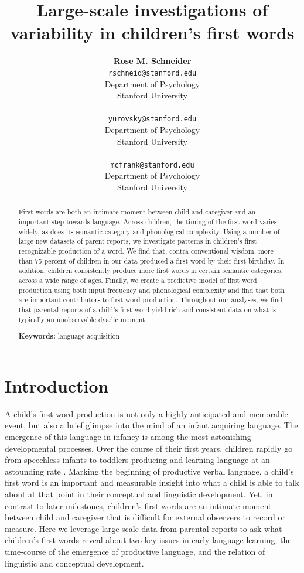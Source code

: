 \documentclass[10pt,letterpaper]{article}
\title{Large-scale investigations of variability in children's first words}
\author{{\large \bf Rose M. Schneider} \\ \texttt{rschneid@stanford.edu}\\ Department of Psychology \\ Stanford University \\ 
\And {\large \bf Daniel Yurovsky} \\ \texttt{yurovsky@stanford.edu} \\ Department of Psychology \\ Stanford University \\ 
\And {\large \bf Michael C. Frank} \\ \texttt{mcfrank@stanford.edu} \\ Department of Psychology \\ Stanford University \\ }
\begin{document}
\maketitle


\begin{abstract}
First words are both an intimate moment between child and caregiver and an important step towards language. Across children, the timing of the first word varies widely, as does its semantic category and phonological complexity. Using a number of large new datasets of parent reports, we investigate patterns in children's first recognizable production of a word. We find that, contra conventional wisdom, more than 75 percent of children in our data produced a first word by their first birthday. In addition, children consistently produce more first words in certain semantic categories, across a wide range of ages. Finally, we create a predictive model of first word production using both input frequency and phonological complexity and find that both are important contributors to first word production. Throughout our analyses, we find that parental reports of a child's first word yield rich and consistent data on what is typically an unobservable dyadic moment. 


\textbf{Keywords:}
language acquisition
\end{abstract}

\section{Introduction}

A child's first word production is not only a highly anticipated and memorable event, but also a brief glimpse into the mind of an infant acquiring language. The emergence of this language in infancy is among the most astonishing developmental processes. Over the course of their first years, children rapidly go from speechless infants to toddlers producing and learning language at an astounding rate \cite{fenson1994,bloom2002}. Marking the beginning of productive verbal language, a child's first word is an important and measurable insight into what a child is able to talk about at that point in their conceptual and linguistic development. Yet, in contrast to later milestones, children's first words are an intimate moment between child and caregiver that is difficult for external observers to record or measure. Here we leverage large-scale data from parental reports to ask what children's first words reveal about two key issues in early language learning; the time-course of the emergence of productive language, and the relation of linguistic and conceptual development. 
\end{document}
